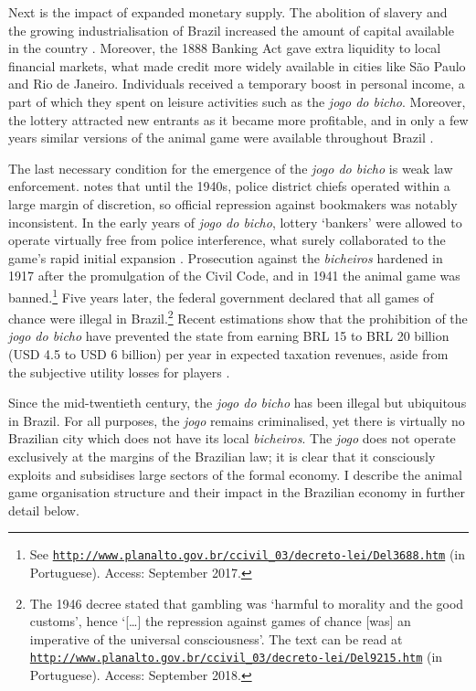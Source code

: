 \documentclass[a4paper,12pt]{article}
\begin{document}
Next is the impact of expanded monetary supply. The abolition of slavery and the growing industrialisation of Brazil increased the amount of capital available in the country \citep{franco1987reformas, schulz2008financial}. Moreover, the 1888 Banking Act gave extra liquidity to local financial markets, what made credit more widely available in cities like São Paulo and Rio de Janeiro. Individuals received a temporary boost in personal income, a part of which they spent on leisure activities such as the \textit{jogo do bicho}. Moreover, the lottery attracted new entrants as it became more profitable, and in only a few years similar versions of the animal game were available throughout Brazil \citep[79]{da1999aguias}.  

The last necessary condition for the emergence of the \textit{jogo do bicho} is weak law enforcement. \citet[69--100]{chazkel2011laws} notes that until the 1940s, police district chiefs operated within a large margin of discretion, so official repression against bookmakers was notably inconsistent. In the early years of \textit{jogo do bicho}, lottery `bankers' were allowed to operate virtually free from police interference, what surely collaborated to the game's rapid initial expansion \citep[544]{chazkel2007beyond}. Prosecution against the \textit{bicheiros} hardened in 1917 after the promulgation of the Civil Code, and in 1941 the animal game was banned.\footnote{See \href{http://www.planalto.gov.br/ccivil_03/decreto-lei/Del3688.htm}{\texttt{http://www.planalto.gov.br/ccivil\_03/decreto-lei/Del3688.htm}} (in Portuguese). Access: September 2017.} Five years later, the federal government declared that all games of chance were illegal in Brazil.\footnote{The 1946 decree stated that gambling was `harmful to morality and the good customs', hence `[\dots] the repression against games of chance [was] an imperative of the universal consciousness'. The text can be read at \href{http://www.planalto.gov.br/ccivil_03/decreto-lei/Del9215.htm}{\texttt{http://www.planalto.gov.br/ccivil\_03/decreto-lei/Del9215.htm}} (in Portuguese). Access: September 2018.} Recent estimations show that the prohibition of the \textit{jogo do bicho} have prevented the state from earning BRL 15 to BRL 20 billion (USD 4.5 to USD 6 billion) per year in expected taxation revenues, aside from the subjective utility losses for players \citep{fsp2016legalizarbicho}.

Since the mid-twentieth century, the \textit{jogo do bicho} has been illegal but ubiquitous in Brazil. For all purposes, the \textit{jogo} remains criminalised, yet there is virtually no Brazilian city which does not have its local \textit{bicheiros}. The \textit{jogo} does not operate exclusively at the margins of the Brazilian law; it is clear that it consciously exploits and subsidises large sectors of the formal economy. I describe the animal game organisation structure and their impact in the Brazilian economy in further detail below.  
\end{document}

